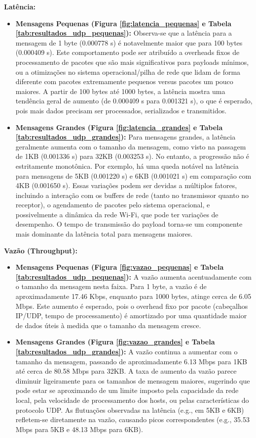 \textbf{Latência:}
\begin{itemize}
    \item \textbf{Mensagens Pequenas (Figura \ref{fig:latencia_pequenas} e Tabela \ref{tab:resultados_udp_pequenas}):} Observa-se que a latência para a mensagem de 1 byte (0.000778 s) é notavelmente maior que para 100 bytes (0.000409 s). Este comportamento pode ser atribuído a overheads fixos de processamento de pacotes que são mais significativos para payloads mínimos, ou a otimizações no sistema operacional/pilha de rede que lidam de forma diferente com pacotes extremamente pequenos versus pacotes um pouco maiores. A partir de 100 bytes até 1000 bytes, a latência mostra uma tendência geral de aumento (de 0.000409 s para 0.001321 s), o que é esperado, pois mais dados precisam ser processados, serializados e transmitidos.
    \item \textbf{Mensagens Grandes (Figura \ref{fig:latencia_grandes} e Tabela \ref{tab:resultados_udp_grandes}):} Para mensagens grandes, a latência geralmente aumenta com o tamanho da mensagem, como visto na passagem de 1KB (0.001336 s) para 32KB (0.003253 s). No entanto, a progressão não é estritamente monotônica. Por exemplo, há uma queda notável na latência para mensagens de 5KB (0.001220 s) e 6KB (0.001021 s) em comparação com 4KB (0.001650 s). Essas variações podem ser devidas a múltiplos fatores, incluindo a interação com os buffers de rede (tanto no transmissor quanto no receptor), o agendamento de pacotes pelo sistema operacional, e possivelmente a dinâmica da rede Wi-Fi, que pode ter variações de desempenho. O tempo de transmissão do payload torna-se um componente mais dominante da latência total para mensagens maiores.
\end{itemize}

\textbf{Vazão (Throughput):}
\begin{itemize}
    \item \textbf{Mensagens Pequenas (Figura \ref{fig:vazao_pequenas} e Tabela \ref{tab:resultados_udp_pequenas}):} A vazão aumenta acentuadamente com o tamanho da mensagem nesta faixa. Para 1 byte, a vazão é de aproximadamente 17.46 Kbps, enquanto para 1000 bytes, atinge cerca de 6.05 Mbps. Este aumento é esperado, pois o overhead fixo por pacote (cabeçalhos IP/UDP, tempo de processamento) é amortizado por uma quantidade maior de dados úteis à medida que o tamanho da mensagem cresce.
    \item \textbf{Mensagens Grandes (Figura \ref{fig:vazao_grandes} e Tabela \ref{tab:resultados_udp_grandes}):} A vazão continua a aumentar com o tamanho da mensagem, passando de aproximadamente 6.13 Mbps para 1KB até cerca de 80.58 Mbps para 32KB. A taxa de aumento da vazão parece diminuir ligeiramente para os tamanhos de mensagem maiores, sugerindo que pode estar se aproximando de um limite imposto pela capacidade da rede local, pela velocidade de processamento dos hosts, ou pelas características do protocolo UDP. As flutuações observadas na latência (e.g., em 5KB e 6KB) refletem-se diretamente na vazão, causando picos correspondentes (e.g., 35.53 Mbps para 5KB e 48.13 Mbps para 6KB).
\end{itemize}

